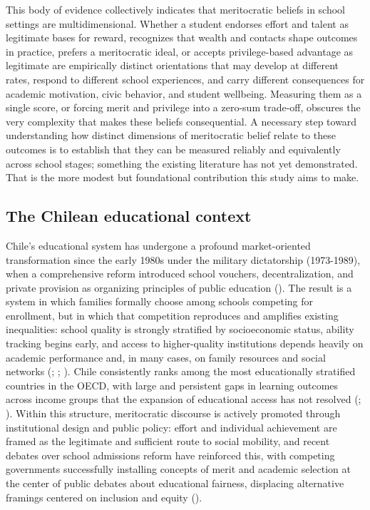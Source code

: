 \documentclass[
  13pt,
]{article}
\begin{document}
This body of evidence collectively indicates that meritocratic beliefs
in school settings are multidimensional. Whether a student endorses
effort and talent as legitimate bases for reward, recognizes that wealth
and contacts shape outcomes in practice, prefers a meritocratic ideal,
or accepts privilege-based advantage as legitimate are empirically
distinct orientations that may develop at different rates, respond to
different school experiences, and carry different consequences for
academic motivation, civic behavior, and student wellbeing. Measuring
them as a single score, or forcing merit and privilege into a zero-sum
trade-off, obscures the very complexity that makes these beliefs
consequential. A necessary step toward understanding how distinct
dimensions of meritocratic belief relate to these outcomes is to
establish that they can be measured reliably and equivalently across
school stages; something the existing literature has not yet
demonstrated. That is the more modest but foundational contribution this
study aims to make.

\subsection{The Chilean educational
context}\label{the-chilean-educational-context}

Chile's educational system has undergone a profound market-oriented
transformation since the early 1980s under the military dictatorship
(1973-1989), when a comprehensive reform introduced school vouchers,
decentralization, and private provision as organizing principles of
public education
().
The result is a system in which families formally choose among schools
competing for enrollment, but in which that competition reproduces and
amplifies existing inequalities: school quality is strongly stratified
by socioeconomic status, ability tracking begins early, and access to
higher-quality institutions depends heavily on academic performance and,
in many cases, on family resources and social networks
(;
;
). Chile
consistently ranks among the most educationally stratified countries in
the OECD, with large and persistent gaps in learning outcomes across
income groups that the expansion of educational access has not resolved
(;
). Within this structure,
meritocratic discourse is actively promoted through institutional design
and public policy: effort and individual achievement are framed as the
legitimate and sufficient route to social mobility, and recent debates
over school admissions reform have reinforced this, with competing
governments successfully installing concepts of merit and academic
selection at the center of public debates about educational fairness,
displacing alternative framings centered on inclusion and equity
().
\end{document}
